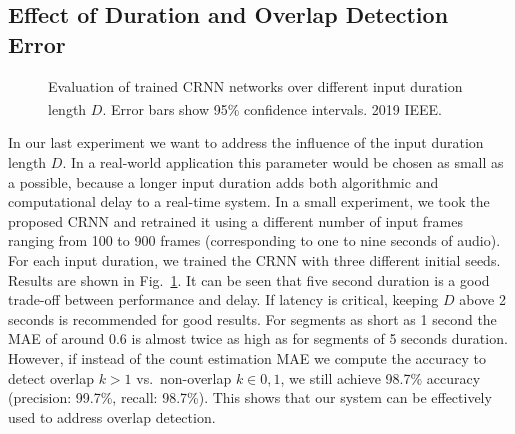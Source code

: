 \subsection{Effect of Duration and Overlap Detection Error}%
\label{ssec:exp_duration}

\begin{figure}[h!]
   \centering
   \centering
   \begin{adjustbox}{width=0.7\columnwidth}
     
   \end{adjustbox}
   \caption{Evaluation of trained CRNN networks over different input duration length \(D\). Error bars show 95\% confidence intervals. \textsuperscript{\textregistered}2019 IEEE.}%
   \label{fig:timesteps}
\end{figure}

In our last experiment we want to address the influence of the input duration length \(D\).
In a real-world application this parameter would be chosen as small as a possible, because a longer input duration adds both algorithmic and computational delay to a real-time system.
In a small experiment, we took the proposed CRNN and retrained it using a different number of input frames ranging from 100 to 900 frames (corresponding to one to nine seconds of audio).
For each input duration, we trained the CRNN with three different initial seeds.
Results are shown in Fig.~\ref{fig:timesteps}.
It can be seen that five second duration is a good trade-off between performance and delay.
If latency is critical, keeping \(D\) above 2 seconds is recommended for good results.
For segments as short as 1 second the MAE of around 0.6 is almost twice as high as for segments of 5 seconds duration.
However, if instead of the count estimation MAE we compute the accuracy to detect overlap \(k > 1\) vs.\ non-overlap \(k \in {0, 1}\), we still achieve 98.7\% accuracy (precision: 99.7\%, recall: 98.7\%). This shows that our system can be effectively used to address overlap detection.

